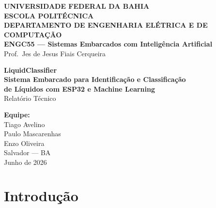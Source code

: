 \documentclass[12pt, a4paper]{article}
\begin{document}
\begin{titlepage}
  \begin{center}
    \textbf{\large UNIVERSIDADE FEDERAL DA BAHIA}\\
    \textbf{\large ESCOLA POLIT\'{E}CNICA}\\
    \textbf{\large DEPARTAMENTO DE ENGENHARIA EL\'{E}TRICA E DE COMPUTA\c{C}\~{A}O}\\
    \vspace{0.5cm}
    \textbf{ENGC55 --- Sistemas Embarcados com Intelig\^{e}ncia Artificial}\\
    \vspace{0.3cm}
    Prof.\ Jes de Jesus Fiais Cerqueira\\
    \vspace{3cm}

    {\LARGE \textbf{LiquidClassifier}}\\
    \vspace{0.5cm}
    {\Large \textbf{Sistema Embarcado para Identifica\c{c}\~{a}o e Classifica\c{c}\~{a}o\\
    de L\'{i}quidos com ESP32 e Machine Learning}}\\
    \vspace{0.5cm}
    {\large Relat\'{o}rio T\'{e}cnico}\\

    \vspace{3cm}

    \textbf{Equipe:}\\
    \vspace{0.3cm}
    Tiago Avelino\\
    Paulo Mascarenhas\\
    Enzo Oliveira\\

    \vfill
    Salvador --- BA\\
    Junho de 2026
  \end{center}
\end{titlepage}

\tableofcontents
\newpage

\section{Introdu\c{c}\~{a}o}
\end{document}

